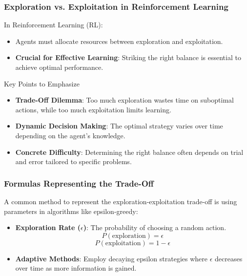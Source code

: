 \documentclass[aspectratio=169]{beamer}
\begin{document}
\begin{frame}[fragile]
    \frametitle{Exploration vs. Exploitation in Reinforcement Learning}
    In Reinforcement Learning (RL):
    \begin{itemize}
        \item Agents must allocate resources between exploration and exploitation.
        \item \textbf{Crucial for Effective Learning}: Striking the right balance is essential to achieve optimal performance.
    \end{itemize}
    
    \begin{block}{Key Points to Emphasize}
        \begin{itemize}
            \item \textbf{Trade-Off Dilemma}: Too much exploration wastes time on suboptimal actions, while too much exploitation limits learning.
            \item \textbf{Dynamic Decision Making}: The optimal strategy varies over time depending on the agent's knowledge.
            \item \textbf{Concrete Difficulty}: Determining the right balance often depends on trial and error tailored to specific problems.
        \end{itemize}
    \end{block}
\end{frame}

\begin{frame}[fragile]
    \frametitle{Formulas Representing the Trade-Off}
    A common method to represent the exploration-exploitation trade-off is using parameters in algorithms like epsilon-greedy:
    
    \begin{itemize}
        \item \textbf{Exploration Rate ($\epsilon$)}: The probability of choosing a random action.
        \begin{equation}
            P(\text{exploration}) = \epsilon 
        \end{equation}
        \begin{equation}
            P(\text{exploitation}) = 1 - \epsilon 
        \end{equation}
        \item \textbf{Adaptive Methods}: Employ decaying epsilon strategies where $\epsilon$ decreases over time as more information is gained.
    \end{itemize}
\end{frame}
\end{document}
